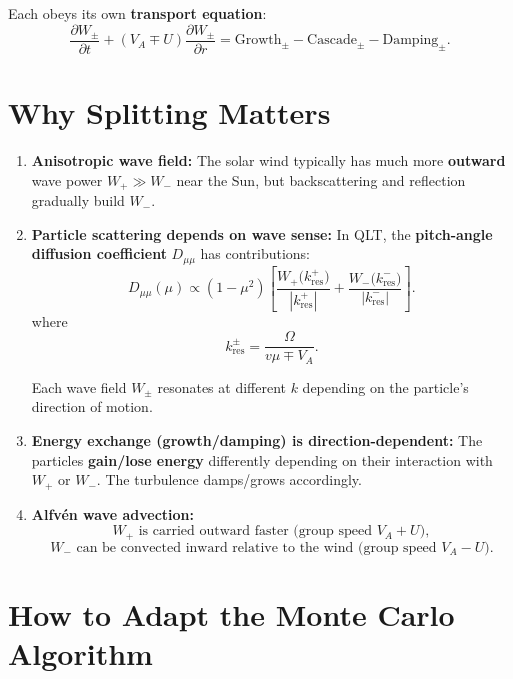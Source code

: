 Each obeys its own \textbf{transport equation}:
\begin{equation}
\frac{\partial W_\pm}{\partial t} + (V_A \mp U) \frac{\partial W_\pm}{\partial r}
= \text{Growth}_\pm - \text{Cascade}_\pm - \text{Damping}_\pm.
\tag{1}
\end{equation}

\hrulefill

\section*{\texorpdfstring{ \textbf{Why Splitting Matters}}{}}

\begin{enumerate}
    \item \textbf{Anisotropic wave field:} The solar wind typically has much more \textbf{outward} wave power $W_+ \gg W_-$ near the Sun, but backscattering and reflection gradually build $W_-$.
    
    \item \textbf{Particle scattering depends on wave sense:} In QLT, the \textbf{pitch-angle diffusion coefficient} $D_{\mu\mu}$ has contributions:
    \[
    D_{\mu\mu}(\mu) \propto (1 - \mu^2) \left[
    \frac{W_+\bigl(k_{\text{res}}^+\bigr)}{|k_{\text{res}}^+|}
    +
    \frac{W_-\bigl(k_{\text{res}}^-\bigr)}{|k_{\text{res}}^-|}
    \right].
    \tag{2}
    \]
    where
    \[
    k_{\text{res}}^\pm = \frac{\Omega}{v\mu \mp V_A}.
    \]
    
    Each wave field $W_\pm$ resonates at different $k$ depending on the particle's direction of motion.
    
    \item \textbf{Energy exchange (growth/damping) is direction-dependent:} The particles \textbf{gain/lose energy} differently depending on their interaction with $W_+$ or $W_-$. The turbulence damps/grows accordingly.
    
    \item \textbf{Alfvén wave advection:}
    \[
    W_+ \text{ is carried outward faster (group speed } V_A + U\text{)},
    \]
    \[
    W_- \text{ can be convected inward relative to the wind (group speed } V_A - U\text{)}.
    \]
\end{enumerate}

\hrulefill

\section*{\texorpdfstring{ \textbf{How to Adapt the Monte Carlo Algorithm}}{}}

